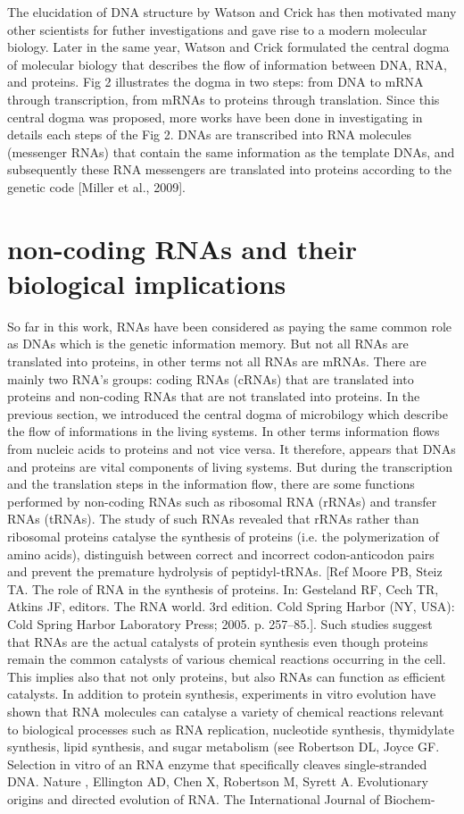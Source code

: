 The elucidation of DNA structure by Watson and Crick has then motivated many other scientists for futher investigations and gave rise to a modern molecular biology. Later in the same year, Watson and Crick formulated the central dogma of molecular biology that describes the flow of information between DNA, RNA, and proteins.  Fig 2 illustrates the dogma in two steps: from DNA to mRNA through transcription, from mRNAs to proteins through translation. Since this central dogma was proposed, more works have been done in investigating  in details each steps of the Fig 2. DNAs are transcribed into RNA molecules (messenger RNAs) that contain the same information as the template DNAs, and subsequently these RNA messengers are translated into proteins according to the genetic code [Miller et al., 2009]. 

\section{non-coding RNAs and their biological implications} 
So far in this work, RNAs have been considered as paying the same common role as DNAs which is the genetic information memory. But not all RNAs are translated into proteins, in other terms not all RNAs are mRNAs. There are mainly two RNA's groups: coding RNAs (cRNAs) that are translated into proteins and non-coding RNAs that are not translated into proteins.  In the previous section, we introduced the central dogma of microbilogy which describe the flow of informations in the living systems. In other terms information flows from nucleic acids to proteins and not vice versa. It therefore, appears that DNAs and proteins are vital components of living systems.  But during the transcription and the translation steps in the information flow, there are some functions performed by non-coding RNAs such as ribosomal RNA (rRNAs) and transfer RNAs (tRNAs). The study of such RNAs revealed that rRNAs rather than ribosomal proteins catalyse the synthesis of proteins  (i.e.  the polymerization of amino acids), distinguish between correct and incorrect codon-anticodon pairs and prevent the premature hydrolysis of peptidyl-tRNAs. [Ref Moore PB, Steiz TA. The role of RNA in the synthesis of proteins. In: Gesteland RF, Cech TR, Atkins JF, editors. The RNA world. 3rd edition. Cold Spring Harbor (NY, USA): Cold Spring Harbor Laboratory Press; 2005. p. 257–85.]. Such studies suggest that RNAs are the actual catalysts of protein synthesis even though proteins remain the common catalysts of various chemical reactions occurring in the cell. This implies also that not only proteins, but also RNAs can function as efficient catalysts.  In addition to protein synthesis, experiments in vitro evolution have shown that RNA molecules can catalyse a variety of chemical reactions relevant to biological processes such as RNA replication, nucleotide synthesis, thymidylate synthesis, lipid synthesis, and sugar metabolism (see Robertson DL, Joyce GF. Selection in vitro of an RNA enzyme that specifically cleaves single-stranded DNA. Nature , Ellington AD, Chen X, Robertson M, Syrett A. Evolutionary origins and directed evolution of RNA. The International Journal of Biochem-
